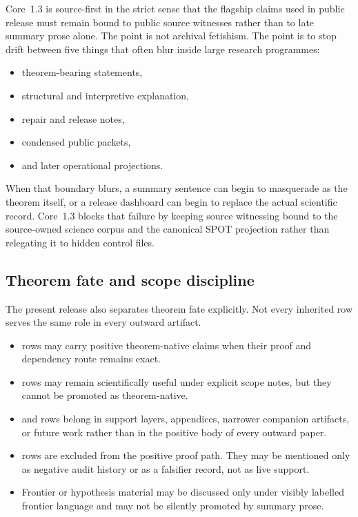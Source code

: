 Core~1.3 is source-first in the strict sense that the flagship claims used in
public release must remain bound to public source witnesses rather than to late
summary prose alone. The point is not archival fetishism. The point is to stop
drift between five things that often blur inside large research programmes:

\begin{itemize}
\item theorem-bearing statements,
\item structural and interpretive explanation,
\item repair and release notes,
\item condensed public packets,
\item and later operational projections.
\end{itemize}

When that boundary blurs, a summary sentence can begin to masquerade as the
theorem itself, or a release dashboard can begin to replace the actual
scientific record. Core~1.3 blocks that failure by keeping source witnessing
bound to the source-owned science corpus and the canonical SPOT projection
rather than relegating it to hidden control files.

\subsection{Theorem fate and scope discipline}

The present release also separates theorem fate explicitly. Not every inherited
row serves the same role in every outward artifact.

\begin{itemize}
\item {} rows may carry positive theorem-native claims
      when their proof and dependency route remains exact.
\item {} rows may remain scientifically useful under
      explicit scope notes, but they cannot be promoted as theorem-native.
\item {} and  rows belong in support
      layers, appendices, narrower companion artifacts, or future work rather
      than in the positive body of every outward paper.
\item {} rows are excluded from the positive proof path. They may
      be mentioned only as negative audit history or as a falsifier record, not
      as live support.
\item Frontier or hypothesis material may be discussed only under visibly
      labelled frontier language and may not be silently promoted by summary
      prose.
\end{itemize}

